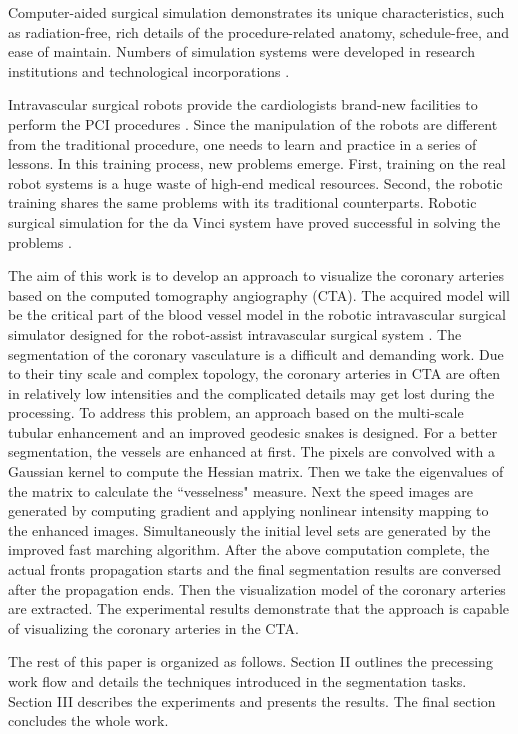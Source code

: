 Computer-aided surgical simulation demonstrates its unique characteristics, such as radiation-free, rich details of the procedure-related anatomy, schedule-free, and ease of maintain.
Numbers of simulation systems were developed in research institutions \cite{Dawson1996DK,Wang1997ICard,Cotin2000ICTS} and technological incorporations \cite{CAEWeb,MenticeWeb,SimbionixWeb}.

Intravascular surgical robots provide the cardiologists brand-new facilities to perform the PCI procedures \cite{NIOBEWeb,HansenWeb,Beyar2006RNS,Smilowitz2012}.
Since the manipulation of the robots are different from the traditional procedure, one needs to learn and practice in a series of lessons.
In this training process, new problems emerge.
First, training on the real robot systems is a huge waste of high-end medical resources.
Second, the robotic training shares the same problems with its traditional counterparts.
Robotic surgical simulation for the da Vinci system have proved successful in solving the problems \cite{Liss2012,Kesavadas2011}.

The aim of this work is to develop an approach to visualize the coronary arteries based on the computed tomography angiography (CTA).
The acquired model will be the critical part of the blood vessel model in the robotic intravascular surgical simulator designed for the robot-assist intravascular surgical system \cite{Ji2011EMBC}.
The segmentation of the coronary vasculature is a difficult and demanding work.
Due to their tiny scale and complex topology, the coronary arteries in CTA are often in relatively low intensities and the complicated details may get lost during the processing.
To address this problem, an approach based on the multi-scale tubular enhancement and an improved geodesic snakes is designed.
For a better segmentation, the vessels are enhanced at first.
The pixels are convolved with a Gaussian kernel to compute the Hessian matrix.
Then we take the eigenvalues of the matrix to calculate the ``vesselness" measure.
Next the speed images are generated by computing gradient and applying nonlinear intensity mapping to the enhanced images.
Simultaneously the initial level sets are generated by the improved fast marching algorithm.
After the above computation complete, the actual fronts propagation starts and the final segmentation results are conversed after the propagation ends.
Then the visualization model of the coronary arteries are extracted.
The experimental results demonstrate that the approach is capable of visualizing the coronary arteries in the CTA.

The rest of this paper is organized as follows.
Section II outlines the precessing work flow and details the techniques introduced in the segmentation tasks.
Section III describes the experiments and presents the results.
The final section concludes the whole work. 